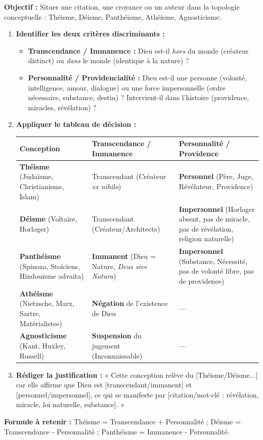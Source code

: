 \documentclass[11pt]{article}
\newcommand{\cle}[1]{{\popxbold\color{popdark}#1}}
\begin{document}
\begin{methode}
\textbf{Objectif :} Situer une citation, une croyance ou un auteur dans la topologie conceptuelle : Théisme, Déisme, Panthéisme, Athéisme, Agnosticisme.
\begin{enumerate}
    \item \textbf{Identifier les deux critères discriminants :}
    \begin{itemize}
        \item \textbf{Transcendance / Immanence :} Dieu est-il \emph{hors} du monde (créateur distinct) ou \emph{dans} le monde (identique à la nature) ?
        \item \textbf{Personnalité / Providencialité :} Dieu est-il une \cle{personne} (volonté, intelligence, amour, dialogue) ou une \cle{force impersonnelle} (ordre nécessaire, substance, destin) ? Intervient-il dans l'histoire (providence, miracles, révélation) ?
    \end{itemize}
    \item \textbf{Appliquer le tableau de décision :}
    \begin{center}
    \begin{tabularx}{\linewidth}{|l|X|X|}\hline
    \textbf{Conception} & \textbf{Transcendance / Immanence} & \textbf{Personnalité / Providence} \\ \hline
    \textbf{Théisme} (Judaïsme, Christianisme, Islam) & Transcendant (Créateur \emph{ex nihilo}) & \textbf{Personnel} (Père, Juge, Révélateur, Providence) \\ \hline
    \textbf{Déisme} (Voltaire, Horloger) & Transcendant (Créateur/Architecte) & \textbf{Impersonnel} (Horloger absent, pas de miracle, pas de révélation, religion naturelle) \\ \hline
    \textbf{Panthéisme} (Spinoza, Stoïciens, Hindouisme advaita) & \textbf{Immanent} (Dieu = Nature, \emph{Deus sive Natura}) & \textbf{Impersonnel} (Substance, Nécessité, pas de volonté libre, pas de providence) \\ \hline
    \textbf{Athéisme} (Nietzsche, Marx, Sartre, Matérialistes) & \textbf{Négation} de l'existence de Dieu & --- \\ \hline
    \textbf{Agnosticisme} (Kant, Huxley, Russell) & \textbf{Suspension} du jugement (Inconnaissable) & --- \\ \hline
    \end{tabularx}
    \end{center}
    \item \textbf{Rédiger la justification :} « Cette conception relève du [Théisme/Déisme...] car elle affirme que Dieu est [transcendant/immanent] et [personnel/impersonnel], ce qui se manifeste par [citation/mot-clé : révélation, miracle, loi naturelle, substance]. »
\end{enumerate}
\textbf{Formule à retenir :} \cle{Théisme = Transcendance + Personnalité} ; \cle{Déisme = Transcendance - Personnalité} ; \cle{Panthéisme = Immanence - Personnalité}.
\end{methode}
\end{document}
